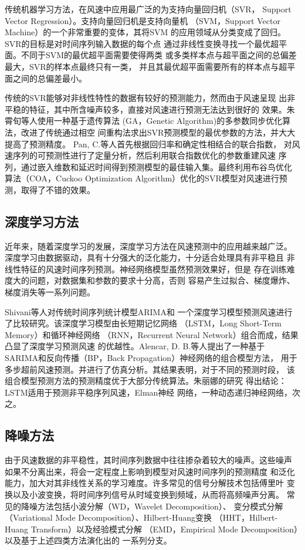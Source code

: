 \documentclass[AutoFakeBold]{LZUThesis}
\begin{document}
传统机器学习方法，在风速中应用最广泛的为支持向量回归机（SVR，
Support Vector Regression）。支持向量回归机是支持向量机
（SVM，Support Vector Machine）的一个非常重要的变体，其将SVM
的应用领域从分类变成了回归。SVR的目标是对时间序列输入数据的每个点
通过非线性变换寻找一个最优超平面。不同于SVM的最优超平面需要使得两类
或多类样本点与超平面之间的总偏差最大，SVR的样本点最终只有一类，
并且其最优超平面需要所有的样本点与超平面之间的总偏差最小。

传统的SVR能够对非线性特性的数据有较好的预测能力，然而由于风速呈现
出非平稳的特征，其中所含噪声较多，直接对风速进行预测无法达到很好的
效果。朱霄旬等人\cite{朱霄旬2017遗传算法对}使用一种基于遗传算法
(GA，Genetic Algorithm)的多参数同步优化算法，改进了传统通过相空
间重构法求出SVR预测模型的最优参数的方法，并大大提高了预测精度。
Pan, C.等人\cite{2018Hybrid}首先根据回归率和确定性相结合的联合指数，
对风速序列的可预测性进行了定量分析，然后利用联合指数优化的参数重建风速
序列，通过嵌入维数和延迟时间得到预测模型的最佳输入集。最终利用布谷鸟优化
算法（COA，Cuckoo Optimization Algorithm）优化的SVR模型对风速进行预
测，取得了不错的效果。

\subsection{深度学习方法}

近年来，随着深度学习的发展，深度学习方法在风速预测中的应用越来越广泛。
深度学习由数据驱动，具有十分强大的泛化能力，十分适合处理具有非平稳且
非线性特征的风速时间序列预测。神经网络模型虽然预测效果好，但是
存在训练难度大的问题，对数据集和参数的要求十分高，否则
容易产生过拟合、梯度爆炸、梯度消失等一系列问题。

Shivani等人\cite{Shivani2019A}对传统时间序列统计模型ARIMA和
一个深度学习模型预测风速进行了比较研究。该深度学习模型由长短期记忆网络
（LSTM，Long Short-Term Memory）和循环神经网络
（RNN，Recurrent Neural Network）组合而成，结果凸显了深度学习预测风速
的优越性。Alencar, D. B.等人\cite{alencar2018hybrid}提出了一种基于
SARIMA和反向传播（BP，Back Propagation）神经网络的组合模型方法，
用于多步超前风速预测。并进行了仿真分析。其结果表明，对于不同的预测时段，
该组合模型预测方法的预测精度优于大部分传统算法。朱丽娜的研究
\cite{朱丽娜2021风电}得出结论：LSTM适用于预测非平稳序列风速，Elman神经
网络，一种动态递归神经网络，次之。

\subsection{降噪方法}
由于风速数据的非平稳性，其时间序列数据中往往掺杂着较大的噪声。这些噪声
如果不分离出来，将会一定程度上影响到模型对风速时间序列的预测精度
和泛化能力，加大对其非线性关系的学习难度。许多常见的信号分解技术包括傅里叶
变换以及小波变换，将时间序列信号从时域变换到频域，从而将高频噪声分离。
常见的降噪方法包括小波分解（WD，Wavelet Decomposition）、
变分模式分解（Variational Mode Decomposition）、Hilbert-Huang变换
（HHT，Hilbert-Huang Transform）以及经验模式分解
（EMD，Empirical Mode Decomposition）以及基于上述四类方法演化出的
一系列分支。
\end{document}
